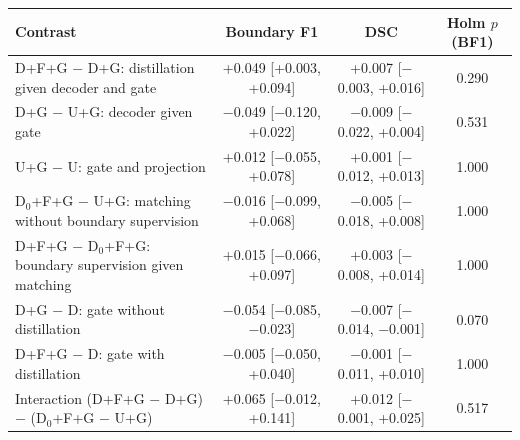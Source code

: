 \begin{tabular}{lccc}
\toprule
Contrast & Boundary F1 & DSC & Holm $p$ (BF1) \\
\midrule
D+F+G $-$ D+G: distillation given decoder and gate & +0.049 [+0.003, +0.094] & +0.007 [$-$0.003, +0.016] & 0.290 \\
D+G $-$ U+G: decoder given gate & $-$0.049 [$-$0.120, +0.022] & $-$0.009 [$-$0.022, +0.004] & 0.531 \\
U+G $-$ U: gate and projection & +0.012 [$-$0.055, +0.078] & +0.001 [$-$0.012, +0.013] & 1.000 \\
D$_0$+F+G $-$ U+G: matching without boundary supervision & $-$0.016 [$-$0.099, +0.068] & $-$0.005 [$-$0.018, +0.008] & 1.000 \\
D+F+G $-$ D$_0$+F+G: boundary supervision given matching & +0.015 [$-$0.066, +0.097] & +0.003 [$-$0.008, +0.014] & 1.000 \\
D+G $-$ D: gate without distillation & $-$0.054 [$-$0.085, $-$0.023] & $-$0.007 [$-$0.014, $-$0.001] & 0.070 \\
D+F+G $-$ D: gate with distillation & $-$0.005 [$-$0.050, +0.040] & $-$0.001 [$-$0.011, +0.010] & 1.000 \\
Interaction (D+F+G $-$ D+G) $-$ (D$_0$+F+G $-$ U+G) & +0.065 [$-$0.012, +0.141] & +0.012 [$-$0.001, +0.025] & 0.517 \\
\bottomrule
\end{tabular}
